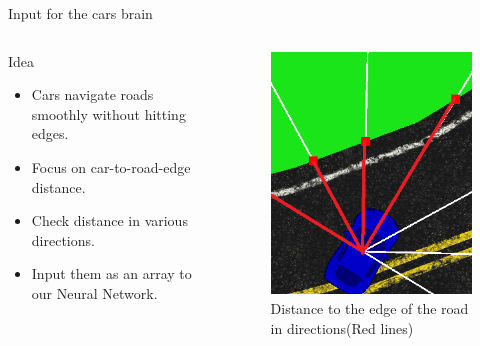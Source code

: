 \documentclass{beamer}
\begin{document}
\begin{frame}{Input for the cars brain}
    \begin{columns}
        \column{.6\textheight}
        \begin{block}{Idea}
            \begin{itemize}
                \item Cars navigate roads smoothly without hitting edges.
                \item Focus on car-to-road-edge distance.
                \item Check distance in various directions.
                \item Input them as an array to our Neural Network.
            \end{itemize} 
        \end{block}
        \column{.4\textheight}
         \begin{figure}
            \includegraphics[width=1.0\linewidth]{cardist.png}
            \caption{\tiny Distance to the edge of the road in directions(Red lines)}
        \end{figure}
    \end{columns}
\end{frame}
\end{document}
